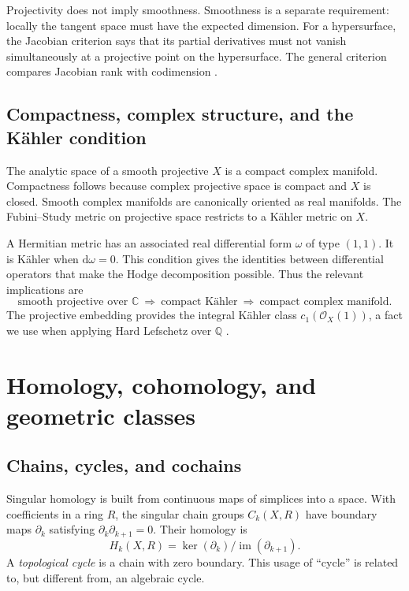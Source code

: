\documentclass[11pt,reqno]{amsart}
\theoremstyle{definition}
\theoremstyle{remark}
\numberwithin{equation}{section}
\newcommand{\C}{\mathbb{C}}
\newcommand{\Q}{\mathbb{Q}}
\newcommand{\OO}{\mathcal{O}}
\newcommand{\dd}{\mathrm{d}}
\DeclareMathOperator{\im}{im}
\begin{document}
Projectivity does not imply smoothness. Smoothness is a separate requirement:
locally the tangent space must have the expected dimension. For a
hypersurface, the Jacobian criterion says that its partial derivatives must
not vanish simultaneously at a projective point on the hypersurface. The
general criterion compares Jacobian rank with codimension \cite{griffithsharris1978}.

\subsection{Compactness, complex structure, and the K\"ahler condition}

The analytic space of a smooth projective $X$ is a compact complex manifold.
Compactness follows because complex projective space is compact and $X$ is
closed. Smooth complex manifolds are canonically oriented as real manifolds.
The Fubini--Study metric on projective space restricts to a K\"ahler metric on
$X$.

A Hermitian metric has an associated real differential form $\omega$ of type
$(1,1)$. It is K\"ahler when $\dd\omega=0$. This condition gives the identities
between differential operators that make the Hodge decomposition possible.
Thus the relevant implications are
\[
 \text{smooth projective over }\C
 \ \Longrightarrow\ \text{compact K\"ahler}
 \ \Longrightarrow\ \text{compact complex manifold}.
\]
The projective embedding provides the integral K\"ahler class
$c_1(\OO_X(1))$, a fact we use when applying Hard Lefschetz over $\Q$
\cite{voisin2002hodge,gaganotes}.

\section{Homology, cohomology, and geometric classes}\label{sec:cohomology}

\subsection{Chains, cycles, and cochains}

Singular homology is built from continuous maps of simplices into a space.
With coefficients in a ring $R$, the singular chain groups $C_k(X,R)$ have
boundary maps $\partial_k$ satisfying $\partial_k\partial_{k+1}=0$. Their
homology is
\[
 H_k(X,R)=\ker(\partial_k)/\im(\partial_{k+1}).
\]
A \emph{topological cycle} is a chain with zero boundary. This usage of
``cycle'' is related to, but different from, an algebraic cycle.
\end{document}
